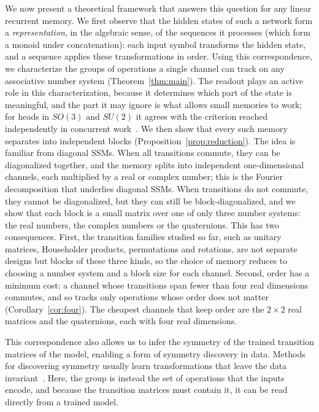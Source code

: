 \documentclass[aps,prx,reprint,superscriptaddress,longbibliography,nofootinbib,floatfix]{revtex4-2}
\theoremstyle{plain}
\theoremstyle{definition}
\begin{document}
We now present a theoretical framework that answers this question for any linear recurrent memory. We first observe that the hidden states of such a network form a
\textit{representation}, in the algebraic sense, of the sequences it processes
(which form a monoid under concatenation): each input symbol transforms the hidden state, and a sequence applies these transformations in order. Using this correspondence, we characterize the groups of operations a single channel can track on any associative number system  (Theorem~\ref{thm:main}). The readout plays an active role in this characterization, because it determines which part of the state is meaningful, and the part it may ignore is what allows small memories to work; for heads in $SO(3)$ and $SU(2)$ it agrees with the criterion reached independently in concurrent work~\cite{jia_ncssm}. We then show that every such memory separates into independent blocks (Proposition~\ref{prop:reduction}). The idea is familiar from diagonal SSMs. When all transitions commute, they can be diagonalized together, and the memory splits into independent one-dimensional channels, each multiplied by a real or complex number; this is the Fourier decomposition that underlies diagonal SSMs. When transitions do not commute, they cannot be diagonalized, but they can still be block-diagonalized, and we show that each block is a small matrix over one of only three number systems: the real numbers, the complex numbers or the quaternions. This has two consequences. First, the transition families studied so far, such as unitary matrices, Householder products, permutations and rotations, are not separate designs but blocks of these three kinds, so the choice of memory reduces to choosing a number system and a block size for each channel. Second, order has a minimum cost: a channel whose transitions span fewer than four real dimensions commutes,
and so tracks only operations whose order does not matter
(Corollary~\ref{cor:four}). The cheapest channels that keep order are the $2\times2$ real matrices and the quaternions, each with four real dimensions.


This correspondence also allows us to infer the symmetry of the trained transition matrices of the model, enabling a form of symmetry discovery in data. Methods for discovering symmetry usually learn transformations that leave the data invariant~\cite{benton,yang_gan}.  Here, the group is instead the set of operations that the inputs encode, and because the transition matrices must contain it, it can be read directly from a trained model.
\end{document}
